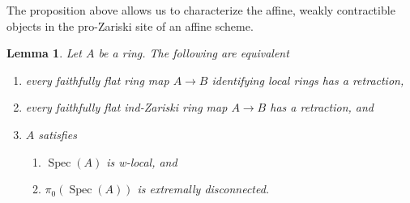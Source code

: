 \documentclass[10pt,a4paper]{article}
\theoremstyle{plain}
\newtheorem{lemma}[subsection]{Lemma}
\theoremstyle{definition}
\theoremstyle{remark}
\numberwithin{equation}{subsection}
\def\Spec{\mathop{\mathrm{Spec}}}
\begin{document}
\noindent
The proposition above allows us to characterize the affine, weakly contractible
objects in the pro-Zariski site of an affine scheme.

\begin{lemma}
\label{lemma-w-local-extremally-disconnected}
Let $A$ be a ring. The following are equivalent
\begin{enumerate}
\item every faithfully flat ring map $A \to B$ identifying local rings
has a retraction,
\item every faithfully flat ind-Zariski ring map $A \to B$ has a retraction, and
\item $A$ satisfies
\begin{enumerate}
\item $\Spec(A)$ is w-local, and
\item $\pi_0(\Spec(A))$ is extremally disconnected.
\end{enumerate}
\end{enumerate}
\end{lemma}
\end{document}
